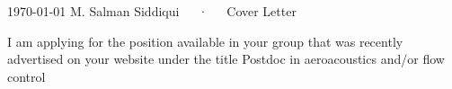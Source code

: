 \documentclass[11pt, a4paper]{awesome-cv}
\begin{document}
	
	\makecvheader
	
	\makecvfooter
	{\today}
	{M. Salman Siddiqui~~~·~~~Cover Letter}
	{}
	
	\makelettertitle
	
	\begin{cvletter}
		
		
		I am applying for the position available in your group that was recently advertised on your website under the title Postdoc in aeroacoustics and/or flow control
		

\end{cvletter}
\end{document}
